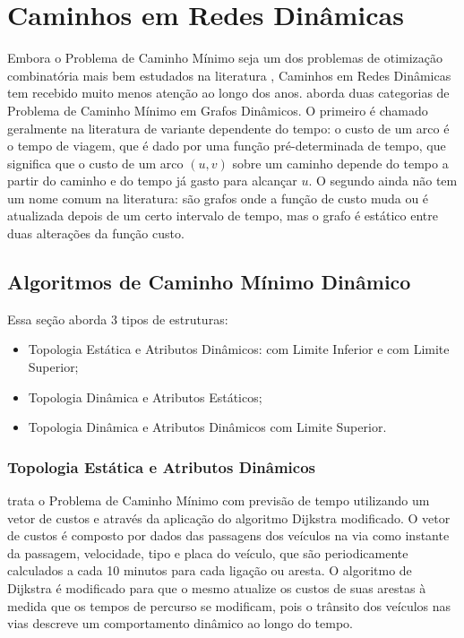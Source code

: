 \section{Caminhos em Redes Dinâmicas}
Embora o Problema de Caminho Mínimo seja um dos problemas de otimização combinatória mais bem estudados
na literatura \cite{bookahuja}, Caminhos em Redes Dinâmicas tem recebido muito menos atenção ao longo dos anos.
\cite{giacomo} aborda duas categorias de Problema de Caminho Mínimo em Grafos Dinâmicos. O primeiro é chamado
geralmente na literatura de variante dependente do tempo: o custo de um arco é o tempo de viagem, que é dado
por uma função pré-determinada de tempo, que significa que o custo de um arco $(u, v)$ sobre um caminho
depende do tempo a partir do caminho e do tempo já gasto para alcançar $u$.
O segundo ainda não tem um nome comum na literatura: são grafos onde a função de custo muda ou é atualizada
depois de um certo intervalo de tempo, mas o grafo é estático entre duas alterações da função custo.

\subsection{Algoritmos de Caminho Mínimo Dinâmico}
Essa seção aborda 3 tipos de estruturas:
\begin{itemize}
\item Topologia Estática e Atributos Dinâmicos: com Limite Inferior \cite{leonard} e com Limite Superior;
\item Topologia Dinâmica e Atributos Estáticos;
\item Topologia Dinâmica e Atributos Dinâmicos com Limite Superior.
\end{itemize}

\subsubsection{Topologia Estática e Atributos Dinâmicos}
\label{subsec:limitesuperior}
\cite{leonard} trata o Problema de Caminho Mínimo com previsão de tempo utilizando um vetor de custos e
através da aplicação do algoritmo Dijkstra modificado. O vetor de custos é composto por dados das passagens 
dos veículos na via como instante da passagem, velocidade, tipo e placa do veículo, que são periodicamente calculados
a cada 10 minutos para cada ligação ou aresta. O algoritmo de Dijkstra é modificado para que o mesmo atualize os custos
de suas arestas à medida que os tempos de percurso se modificam, pois o trânsito dos veículos nas vias descreve um
comportamento dinâmico ao longo do tempo.

